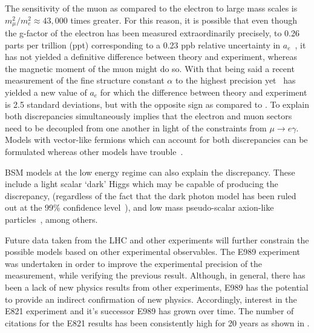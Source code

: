 The sensitivity of the muon as compared to the electron to large mass scales is $ m_{\mu}^{2} / m_{e}^{2} \approx 43,000$ times greater. For this reason, it is possible that even though the g-factor of the electron has been measured extraordinarily precisely, to 0.26 parts per trillion (ppt) corresponding to a 0.23 ppb relative uncertainty in $a_{e}$~\cite{CODATA,ElectronMDM}, it has not yielded a definitive difference between theory and experiment, whereas the magnetic moment of the muon might do so. With that being said a recent measurement of the fine structure constant $\alpha$ to the highest precision yet~\cite{finestructureBerkeley} has yielded a new value of $a_{e}$ for which the difference between theory and experiment is 2.5 standard deviations, but with the opposite sign as compared to \amu. To explain both discrepancies simultaneously implies that the electron and muon sectors need to be decoupled from one another in light of the constraints from $\mu \rightarrow e\gamma$. Models with vector-like fermions which can account for both discrepancies can be formulated whereas other models have trouble~\cite{PhysRevD.98.113002}.



BSM models at the low energy regime can also explain the discrepancy. These include a light scalar `dark' Higgs which may be capable of producing the discrepancy\cite{Chen:2015vqy}, (regardless of the fact that the dark photon model has been ruled out at the 99\% confidence level~\cite{Ablikim:2017aab}), and low mass pseudo-scalar axion-like particles~\cite{Marciano_2016}, among others.



Future data taken from the LHC and other experiments will further constrain the possible models based on other experimental observables. The E989 experiment was undertaken in order to improve the experimental precision of the \amu measurement, while verifying the previous result. Although, in general, there has been a lack of new physics results from other experiments, E989 has the potential to provide an indirect confirmation of new physics. Accordingly, interest in the E821 experiment and it's successor E989 has grown over time. The number of citations for the E821 results has been consistently high for 20 years as shown in .



